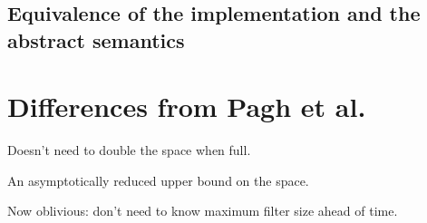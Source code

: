 \documentclass[11pt,letterpaper]{article}
\begin{document}









\subsection{Equivalence of the implementation and the abstract semantics}

\section{Differences from Pagh et al.}

Doesn't need to double the space when full.

An asymptotically reduced upper bound on the space.

Now oblivious: don't need to know maximum filter size ahead of time.

{}

\end{document}
